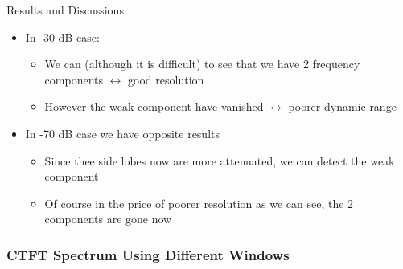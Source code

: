 \begin{frame}[t,allowframebreaks]{Results and Discussions}
\begin{itemize}
\item In -30 dB case:

	\begin{itemize}
	\item We can (although it is difficult) to see that we have 2 frequency components $\leftrightarrow$ good resolution
	
	\item However the weak component have vanished $\leftrightarrow$ poorer dynamic range
	\end{itemize}

\item In -70 dB case we have opposite results

	\begin{itemize}
	\item Since thee side lobes now are more attenuated, we can detect the weak component
	
	\item Of course in the price of poorer resolution as we can see, the 2 components are gone now
	\end{itemize}

\end{itemize}


\end{frame}


\subsubsection{CTFT Spectrum Using Different Windows}

